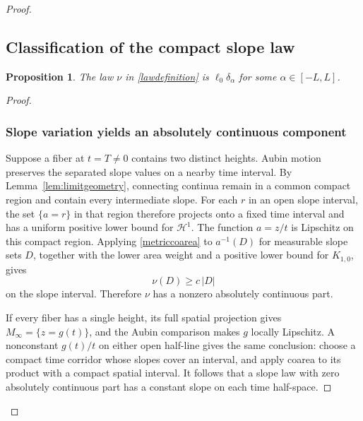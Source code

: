 \documentclass[11pt]{article}
\newtheorem{proposition}[theorem]{Proposition}
\newcommand{\HH}{\mathcal H}
\begin{document}
\begin{proof}
\subsection{Classification of the compact slope law}
\begin{proposition}\label{prop:lawdirac}
The law $\nu$ in \eqref{lawdefinition} is $\ell_0\delta_\alpha$ for some $\alpha\in[-L,L]$.
\end{proposition}
\begin{proof}\leavevmode\par
\subsubsection{Slope variation yields an absolutely continuous component}
Suppose a fiber at $t=T\ne0$ contains two distinct heights. Aubin motion preserves the separated slope values on a nearby time interval. By Lemma~\ref{lem:limitgeometry}, connecting continua remain in a common compact region and contain every intermediate slope. For each $r$ in an open slope interval, the set $\{a=r\}$ in that region therefore projects onto a fixed time interval and has a uniform positive lower bound for $\HH^1$. The function $a=z/t$ is Lipschitz on this compact region. Applying \eqref{metriccoarea} to $a^{-1}(D)$ for measurable slope sets $D$, together with the lower area weight and a positive lower bound for $K_{1,0}$, gives
\[
 \nu(D)\ge c\,|D|
\]
on the slope interval. Therefore $\nu$ has a nonzero absolutely continuous part.

If every fiber has a single height, its full spatial projection gives $M_\infty=\{z=g(t)\}$, and the Aubin comparison makes $g$ locally Lipschitz. A nonconstant $g(t)/t$ on either open half-line gives the same conclusion: choose a compact time corridor whose slopes cover an interval, and apply coarea to its product with a compact spatial interval. It follows that a slope law with zero absolutely continuous part has a constant slope on each time half-space.


\end{proof}
\end{proof}
\end{document}
